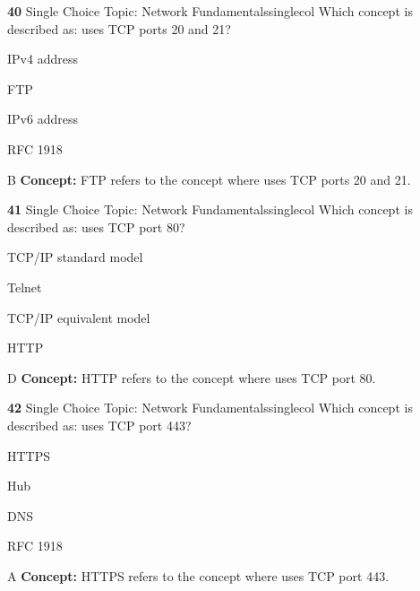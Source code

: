 \documentclass[10pt,a4paper]{article}
\begin{document}
\begin{qcard}{\color{white}\textbf{40} \hfill \small Single Choice \textbar{} Topic: Network Fundamentals}{singlecol}
Which concept is described as: uses TCP ports 20 and 21?

\begin{qoptions}
\item IPv4 address
\item FTP
\item IPv6 address
\item RFC 1918
\end{qoptions}
\begin{explainbox}{B}
\textbf{Concept:} FTP refers to the concept where uses TCP ports 20 and 21.
\end{explainbox}
\end{qcard}

\begin{qcard}{\color{white}\textbf{41} \hfill \small Single Choice \textbar{} Topic: Network Fundamentals}{singlecol}
Which concept is described as: uses TCP port 80?

\begin{qoptions}
\item TCP/IP standard model
\item Telnet
\item TCP/IP equivalent model
\item HTTP
\end{qoptions}
\begin{explainbox}{D}
\textbf{Concept:} HTTP refers to the concept where uses TCP port 80.
\end{explainbox}
\end{qcard}

\begin{qcard}{\color{white}\textbf{42} \hfill \small Single Choice \textbar{} Topic: Network Fundamentals}{singlecol}
Which concept is described as: uses TCP port 443?

\begin{qoptions}
\item HTTPS
\item Hub
\item DNS
\item RFC 1918
\end{qoptions}
\begin{explainbox}{A}
\textbf{Concept:} HTTPS refers to the concept where uses TCP port 443.
\end{explainbox}
\end{qcard}
\end{document}
